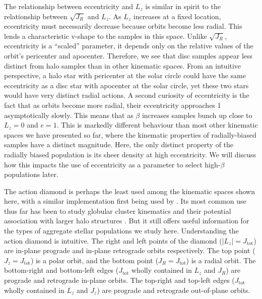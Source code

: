 The relationship between eccentricity and $L_{z}$ is similar in spirit to the relationship between $\sqrt{J_{R}}$ and $L_{z}$. As $L_{z}$ increases at a fixed location, eccentricity must necessarily decrease because orbits become less radial. This lends a characteristic v-shape to the samples in this space. Unlike $\sqrt{J_{R}}$, eccentricity is a ``scaled'' parameter, it depends only on the relative values of the orbit's pericenter and apocenter. Therefore, we see that disc samples appear less distinct from halo samples than in other kinematic spaces. From an intuitive perspective, a halo star with pericenter at the solar circle could have the same eccentricity as a disc star with apocenter at the solar circle, yet these two stars would have very distinct radial actions. A second curiosity of eccentricity is the fact that as orbits become more radial, their eccentricity approaches 1 asymptotically slowly. This means that as $\beta$ increases samples bunch up close to $L_{z}=0$ and $e=1$. This is markedly different behaviour than most other kinematic spaces we have presented so far, where the kinematic properties of radially-biased samples have a distinct magnitude. Here, the only distinct property of the radially biased population is its sheer density at high eccentricity. We will discuss how this impacts the use of eccentricity as a parameter to select high-$\beta$ populations later.

The action diamond is perhaps the least used among the kinematic spaces shown here, with a similar implementation first being used by \citet{vasiliev19} \citep[to our knowledge, although they recognize that the space is analogous to visualisations of three-dimensional action spaces presented by][]{binney08}. Its most common use thus far has been to study globular cluster kinematics and their potential association with larger halo structures \citep{vasiliev19,myeong19}. But it still offers useful information for the types of aggregate stellar populations we study here. Understanding the action diamond is intuitive. The right and left points of the diamond ($\lvert L_{z} \rvert =J_\mathrm{tot}$) are in-plane prograde and in-plane retrograde orbits respectively. The top point ($J_{z}=J_\mathrm{tot}$) is a polar orbit, and the bottom point ($J_{R}=J_\mathrm{tot}$) is a radial orbit. The bottom-right and bottom-left edges ($J_\mathrm{tot}$ wholly contained in $L_{z}$ and $J_{R}$) are prograde and retrograde in-plane orbits. The top-right and top-left edges ($J_\mathrm{tot}$ wholly contained in $L_{z}$ and $J_{z}$) are prograde and retrograde out-of-plane orbits.

